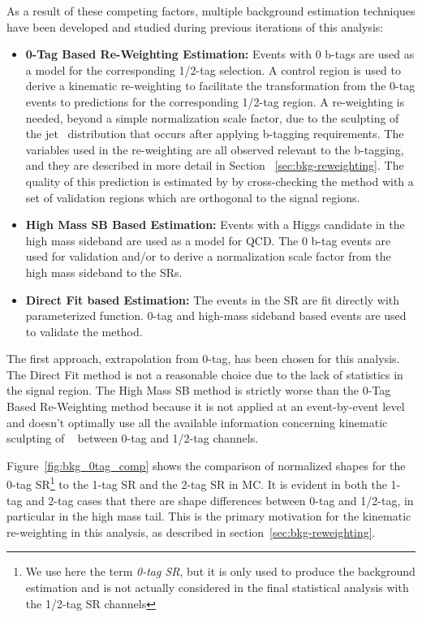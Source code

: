 As a result of these competing factors, multiple background estimation techniques have been developed and studied during previous iterations of this analysis:
\begin{itemize}
    \itemsep0em 
\item \textbf{0-Tag Based Re-Weighting Estimation:}
    Events with 0 b-tags are used as a model for the corresponding 1/2-tag selection.
    A control region is used to derive a kinematic re-weighting to facilitate the transformation from the 0-tag events to predictions for the corresponding 1/2-tag region.
    A re-weighting is needed, beyond a simple normalization scale factor, due to the sculpting of the jet \pt\ distribution that occurs after applying b-tagging requirements.
    The variables used in the re-weighting are all observed relevant to the b-tagging, and they are described in more detail in Section ~\ref{sec:bkg-reweighting}.
    The quality of this prediction is estimated by by cross-checking the method with a set of validation regions which are orthogonal to the signal regions.

\item \textbf{High Mass SB Based Estimation:}
    Events with a Higgs candidate in the high mass sideband are used as a model for QCD.
    The 0 b-tag events are used for validation and/or to derive a normalization scale factor from the high mass sideband to the SRs.

\item \textbf{Direct Fit based Estimation:}
    The events in the SR are fit directly with parameterized function.
    0-tag and high-mass sideband based events are used to validate the method.
\end{itemize}

The first approach, extrapolation from 0-tag, has been chosen for this analysis.
The Direct Fit method is not a reasonable choice due to the lack of statistics in the signal region.
The High Mass SB method is strictly worse than the 0-Tag Based Re-Weighting method because it is not applied at an event-by-event level and doesn't optimally use all the available information concerning kinematic sculpting of \mvh~ between 0-tag and 1/2-tag channels.

Figure~\ref{fig:bkg_0tag_comp} shows the comparison of normalized shapes for the 0-tag SR\footnote{We use here the term \textit{0-tag SR}, but it is only used to produce the background estimation and is not actually considered in the final statistical analysis with the 1/2-tag SR channels} to the 1-tag SR and the 2-tag SR in MC.
It is evident in both the 1-tag and 2-tag cases that there are shape differences between 0-tag and 1/2-tag, in particular in the high mass tail.
This is the primary motivation for the kinematic re-weighting in this analysis, as described in section~\ref{sec:bkg-reweighting}.

